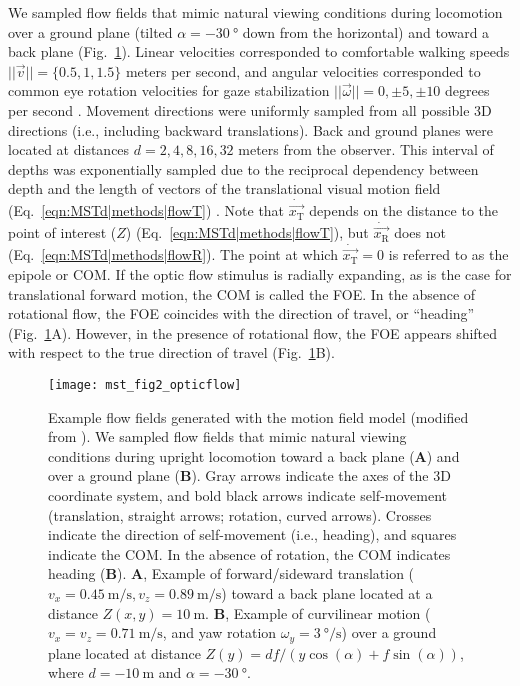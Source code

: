 We sampled flow fields that mimic natural viewing conditions during locomotion 
over a ground plane (tilted $\alpha=\SI{-30}{\degree}$ down from the horizontal)
and toward a back plane (Fig.~\ref{fig:MSTd|flow}).
Linear velocities corresponded to comfortable walking speeds 
$||\vec{v}||=\{0.5, 1, 1.5\}$ meters per second, and angular velocities corresponded
to common eye rotation velocities for gaze stabilization
$||\vec{\omega}||={0, \pm 5, \pm 10}$ degrees per second \citep{PerroneStone1994}.
Movement directions were uniformly sampled from all possible 3D directions 
(i.e., including backward translations). Back and ground planes were located at
distances $d={2,4,8,16,32}$ meters from the observer. This interval of depths 
was exponentially sampled due to the reciprocal dependency between depth and the
length of vectors of the translational visual motion field 
(Eq.~\ref{eqn:MSTd|methods|flowT}) \citep{PerroneStone1994}.
Note that $\dot{\vec{x_{\textrm{T}}}}$ depends on the distance to the point 
of interest ($Z$) (Eq.~\ref{eqn:MSTd|methods|flowT}), but $\dot{\vec{x_{\textrm{R}}}}$
does not (Eq.~\ref{eqn:MSTd|methods|flowR}). 
The point at which $\dot{\vec{x_{\textrm{T}}}} = 0$ is referred to as the epipole
or \acf{COM}. If the optic flow stimulus is radially expanding, as is the case 
for translational forward motion, the \ac{COM} is called the \acf{FOE}.
In the absence of rotational flow, the \ac{FOE} coincides with the direction of
travel, or ``heading'' (Fig.~\ref{fig:MSTd|flow}A). 
However, in the presence of rotational flow, the \ac{FOE} appears shifted with
respect to the true direction of travel (Fig.~\ref{fig:MSTd|flow}B).

\begin{figure}[t]
  \centering
  \texttt{[image: mst\_fig2\_opticflow]}
  \caption{
  Example flow fields generated with the motion field model 
  \citep{LonguetHigginsPrazdny1980} (modified from \cite{Raudies2013}).
  We sampled flow fields that mimic natural viewing conditions during upright
  locomotion toward a back plane (\textbf{A}) and over a ground plane (\textbf{B}).
  Gray arrows indicate the axes of the 3D coordinate
  system, and bold black arrows indicate self-movement (translation, 
  straight arrows; rotation, curved arrows). Crosses indicate the direction of 
  self-movement (i.e., heading), and squares indicate the \acf{COM}.
  In the absence of rotation, the \ac{COM} indicates heading (\textbf{B}). 
  \textbf{A}, Example of forward/sideward translation 
  ($v_x=\SI{0.45}{\meter\per\second}, v_z=\SI{0.89}{\meter\per\second}$) 
  toward a back plane located at a distance $Z(x,y)=\SI{10}{\meter}$. 
  \textbf{B}, Example of curvilinear motion ($v_x=v_z=\SI{0.71}{\meter\per\second}$,
  and yaw rotation $\omega_y=\SI{3}{\degree\per\second}$) over a ground plane 
  located at distance $Z(y) = df/(y \cos(\alpha) + f \sin(\alpha))$, 
  where $d=\SI{-10}{\meter}$ and $\alpha=\SI{-30}{\degree}$.}
  \label{fig:MSTd|flow}
\end{figure}

